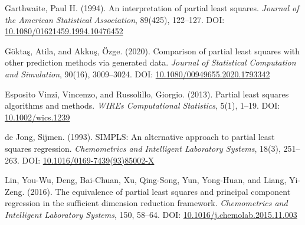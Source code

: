 \documentclass[11pt,twoside,a4paper]{article}
\begin{document}
\begin{thebibliography}{99}
Garthwaite, Paul H. (1994). An interpretation of partial least squares. \textit{Journal of the American Statistical Association}, 89(425), 122–127. DOI: \href{https://doi.org/10.1080/01621459.1994.10476452}{10.1080/01621459.1994.10476452}

Göktaş, Atila, and Akkuş, Özge. (2020). Comparison of partial least squares with other prediction methods via generated data. \textit{Journal of Statistical Computation and Simulation}, 90(16), 3009–3024. DOI: \href{https://doi.org/10.1080/00949655.2020.1793342}{10.1080/00949655.2020.1793342}

Esposito Vinzi, Vincenzo, and Russolillo, Giorgio. (2013). Partial least squares algorithms and methods. \textit{WIREs Computational Statistics}, 5(1), 1–19. DOI: \href{https://doi.org/10.1002/wics.1239}{10.1002/wics.1239}

de Jong, Sijmen. (1993). SIMPLS: An alternative approach to partial least squares regression. \textit{Chemometrics and Intelligent Laboratory Systems}, 18(3), 251–263. DOI: \href{https://doi.org/10.1016/0169-7439(93)85002-X}{10.1016/0169-7439(93)85002-X}

Lin, You-Wu, Deng, Bai-Chuan, Xu, Qing-Song, Yun, Yong-Huan, and Liang, Yi-Zeng. (2016). The equivalence of partial least squares and principal component regression in the sufficient dimension reduction framework. \textit{Chemometrics and Intelligent Laboratory Systems}, 150, 58–64. DOI: \href{https://doi.org/10.1016/j.chemolab.2015.11.003}{10.1016/j.chemolab.2015.11.003}

\end{thebibliography}
\end{document}
